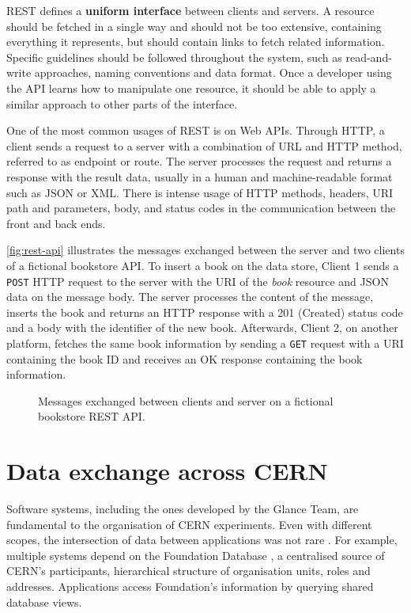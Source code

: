 REST defines a \textbf{uniform interface} between clients and servers. A resource should be fetched in a single way and should not be too extensive, containing everything it represents, but should contain links to fetch related information. Specific guidelines should be followed throughout the system, such as read-and-write approaches, naming conventions and data format. Once a developer using the API learns how to manipulate one resource, it should be able to apply a similar approach to other parts of the interface.

One of the most common usages of REST is on Web APIs. Through HTTP, a client sends a request to a server with a combination of URL and HTTP method, referred to as endpoint or route. The server processes the request and returns a response with the result data, usually in a human and machine-readable format such as JSON or XML. There is intense usage of HTTP methods, headers, URI path and parameters, body, and status codes in the communication between the front and back ends.

\autoref{fig:rest-api} illustrates the messages exchanged between the server and two clients of a fictional bookstore API. To insert a book on the data store, Client 1 sends a \texttt{POST} HTTP request to the server with the URI of the \textit{book} resource and JSON data on the message body. The server processes the content of the message, inserts the book and returns an HTTP response with a 201 (Created) status code and a body with the identifier of the new book. Afterwards, Client 2, on another platform, fetches the same book information by sending a \texttt{GET} request with a URI containing the book ID and receives an OK response containing the book information.

\begin{figure}[htbp]
  \centering
  
  \caption{Messages exchanged between clients and server on a fictional bookstore REST API.}
  \label{fig:rest-api}
\end{figure}

\section{Data exchange across CERN}

Software systems, including the ones developed by the Glance Team, are fundamental to the organisation of CERN experiments. Even with different scopes, the intersection of data between applications was not rare \cite{de-jesus-tcc}. For example, multiple systems depend on the Foundation Database \cite{foundation-website}, a centralised source of CERN's participants, hierarchical structure of organisation units, roles and addresses. Applications access Foundation's information by querying shared database views.

